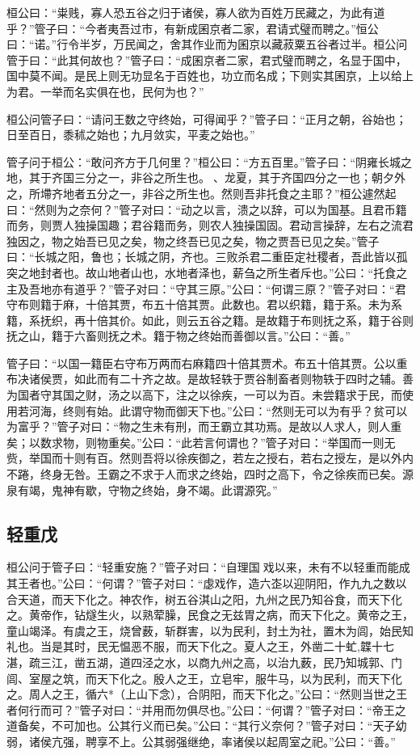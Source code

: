 \documentclass[]{article}
\begin{document}
桓公曰：``粜贱，寡人恐五谷之归于诸侯，寡人欲为百姓万民藏之，为此有道乎？''管子曰：``今者夷吾过市，有新成囷京者二家，君请式璧而聘之。''恒公曰：``诺。''行令半岁，万民闻之，舍其作业而为囷京以藏菽粟五谷者过半。桓公问管于曰：``此其何故也？''管子曰：``成囷京者二家，君式璧而聘之，名显于国中，国中莫不闻。是民上则无功显名于百姓也，功立而名成；下则实其囷京，上以给上为君。一举而名实俱在也，民何为也？''

桓公问管子曰：``请问王数之守终始，可得闻乎？''管子曰：``正月之朝，谷始也；日至百日，黍秫之始也；九月敛实，平麦之始也。''

管子问于桓公：``敢问齐方于几何里？''桓公曰：``方五百里。''管子曰：``阴雍长城之地，其于齐国三分之一，非谷之所生也。、龙夏，其于齐国四分之一也；朝夕外之，所墆齐地者五分之一，非谷之所生也。然则吾非托食之主耶？''桓公遽然起曰：``然则为之奈何？''管子对曰：``动之以言，溃之以辞，可以为国基。且君币籍而务，则贾人独操国趣；君谷籍而务，则农人独操国固。君动言操辞，左右之流君独因之，物之始吾已见之矣，物之终吾已见之矣，物之贾吾已见之矣。''管子曰：``长城之阳，鲁也；长城之阴，齐也。三败杀君二重臣定社稷者，吾此皆以孤突之地封者也。故山地者山也，水地者泽也，薪刍之所生者斥也。''公曰：``托食之主及吾地亦有道乎？''管子对曰：``守其三原。''公曰：``何谓三原？''管子对曰：``君守布则籍于麻，十倍其贾，布五十倍其贾。此数也。君以织籍，籍于系。未为系籍，系抚织，再十倍其价。如此，则云五谷之籍。是故籍于布则抚之系，籍于谷则抚之山，籍于六畜则抚之术。籍于物之终始而善御以言。''公曰：``善。''

管子曰：``以国一籍臣右守布万两而右麻籍四十倍其贾术。布五十倍其贾。公以重布决诸侯贾，如此而有二十齐之故。是故轻轶于贾谷制畜者则物轶于四时之辅。善为国者守其国之财，汤之以高下，注之以徐疾，一可以为百。未尝籍求于民，而使用若河海，终则有始。此谓守物而御天下也。''公曰：``然则无可以为有乎？贫可以为富乎？''管子对曰：``物之生未有刑，而王霸立其功焉。是故以人求人，则人重矣；以数求物，则物重矣。''公曰：``此若言何谓也？''管子对曰：``举国而一则无赀，举国而十则有百。然则吾将以徐疾御之，若左之授右，若右之授左，是以外内不踡，终身无咎。王霸之不求于人而求之终始，四时之高下，令之徐疾而已矣。源泉有竭，鬼神有歇，守物之终始，身不竭。此谓源究。''

\hypertarget{header-n1113}{%
\subsection{轻重戊}\label{header-n1113}}

桓公问于管子曰：``轻重安施？''管子对曰：``自理国戏以来，未有不以轻重而能成其王者也。''公曰：``何谓？''管子对曰：``虙戏作，造六峜以迎阴阳，作九九之数以合天道，而天下化之。神农作，树五谷淇山之阳，九州之民乃知谷食，而天下化之。黄帝作，钻燧生火，以熟荤臊，民食之无兹胃之病，而天下化之。黄帝之王，童山竭泽。有虞之王，烧曾薮，斩群害，以为民利，封土为社，置木为闾，始民知礼也。当是其时，民无愠恶不服，而天下化之。夏人之王，外凿二十虻,韘十七湛，疏三江，凿五湖，道四泾之水，以商九州之高，以治九薮，民乃知城郭、门闾、室屋之筑，而天下化之。殷人之王，立皂牢，服牛马，以为民利，而天下化之。周人之王，循六*（上山下念），合阴阳，而天下化之。''公曰：``然则当世之王者何行而可？''管子对曰：``并用而勿俱尽也。''公曰：``何谓？''管子对曰：``帝王之道备矣，不可加也。公其行义而已矣。''公曰：``其行义奈何？''管子对曰：``天子幼弱，诸侯亢强，聘享不上。公其弱强继绝，率诸侯以起周室之祀。''公曰：``善。''
\end{document}
